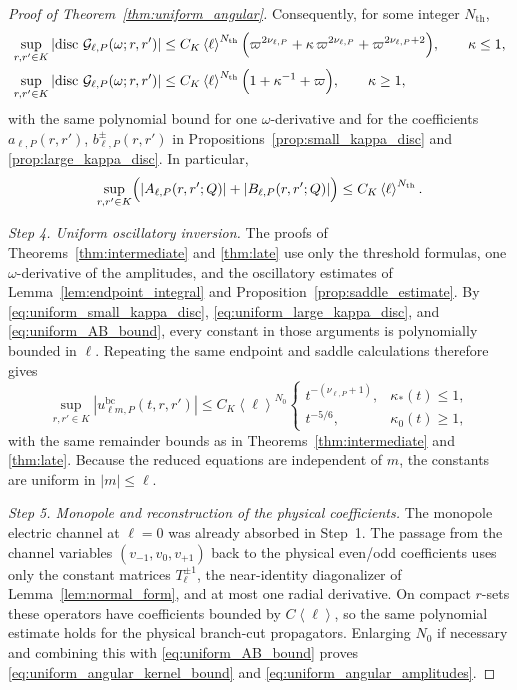 \documentclass[12pt]{article}
\numberwithin{equation}{section}
\theoremstyle{plain}
\theoremstyle{definition}
\theoremstyle{remark}
\newcommand{\disc}{\operatorname{disc}}
\newcommand{\bc}{\mathrm{bc}}
\newcommand{\cG}{\mathcal G}
\newcommand{\om}{\omega}
\newcommand{\vp}{\varpi}
\newcommand{\kap}{\kappa}
\newcommand{\angles}[1]{\left\langle #1 \right\rangle}
\newcommand{\abs}[1]{\left|#1\right|}
\begin{document}
\begin{proof}[Proof of Theorem~\ref{thm:uniform_angular}]
Consequently, for some integer $N_{\mathrm{th}}$,
\begin{align}
   \sup_{r,r'\in K}
   \abs{\disc\,\cG_{\ell,P}(\om;r,r')}
   &\le
   C_K\angles{\ell}^{N_{\mathrm{th}}}
   \Bigl(
      \vp^{2\nu_{\ell,P}}
      +\kap\,\vp^{2\nu_{\ell,P}}
      +\vp^{2\nu_{\ell,P}+2}
   \Bigr),
   \qquad \kap\le1,
   \label{eq:uniform_small_kappa_disc}
   \\
   \sup_{r,r'\in K}
   \abs{\disc\,\cG_{\ell,P}(\om;r,r')}
   &\le
   C_K\angles{\ell}^{N_{\mathrm{th}}}
   \Bigl(
      1+\kap^{-1}+\vp
   \Bigr),
   \qquad \kap\ge1,
   \label{eq:uniform_large_kappa_disc}
\end{align}
with the same polynomial bound for one $\om$-derivative and for the coefficients $a_{\ell,P}(r,r')$, $b_{\ell,P}^\pm(r,r')$ in Propositions~\ref{prop:small_kappa_disc} and \ref{prop:large_kappa_disc}.  In particular,
\begin{equation}\label{eq:uniform_AB_bound}
   \sup_{r,r'\in K}
   \Bigl(
      \abs{A_{\ell,P}(r,r';Q)}
      +
      \abs{B_{\ell,P}(r,r';Q)}
   \Bigr)
   \le C_K\angles{\ell}^{N_{\mathrm{th}}}.
\end{equation}

\smallskip
\noindent\textit{Step 4. Uniform oscillatory inversion.}
The proofs of Theorems~\ref{thm:intermediate} and \ref{thm:late} use only the threshold formulas, one $\om$-derivative of the amplitudes, and the oscillatory estimates of Lemma~\ref{lem:endpoint_integral} and Proposition~\ref{prop:saddle_estimate}.  By \eqref{eq:uniform_small_kappa_disc}, \eqref{eq:uniform_large_kappa_disc}, and \eqref{eq:uniform_AB_bound}, every constant in those arguments is polynomially bounded in $\ell$.  Repeating the same endpoint and saddle calculations therefore gives
\[
   \sup_{r,r'\in K}\abs{u_{\ell m,P}^{\bc}(t,r,r')}
   \le
   C_K\angles{\ell}^{N_0}
   \begin{cases}
      t^{-(\nu_{\ell,P}+1)}, & \kap_*(t)\le1,\\[0.5ex]
      t^{-5/6}, & \kap_0(t)\ge1,
   \end{cases}
\]
with the same remainder bounds as in Theorems~\ref{thm:intermediate} and \ref{thm:late}.  Because the reduced equations are independent of $m$, the constants are uniform in $\abs{m}\le\ell$.

\smallskip
\noindent\textit{Step 5. Monopole and reconstruction of the physical coefficients.}
The monopole electric channel at $\ell=0$ was already absorbed in Step~1.  The passage from the channel variables $(v_{-1},v_0,v_{+1})$ back to the physical even/odd coefficients uses only the constant matrices $T_\ell^{\pm1}$, the near-identity diagonalizer of Lemma~\ref{lem:normal_form}, and at most one radial derivative.  On compact $r$-sets these operators have coefficients bounded by $C\angles{\ell}$, so the same polynomial estimate holds for the physical branch-cut propagators.  Enlarging $N_0$ if necessary and combining this with \eqref{eq:uniform_AB_bound} proves \eqref{eq:uniform_angular_kernel_bound} and \eqref{eq:uniform_angular_amplitudes}.
\end{proof}
\end{document}
